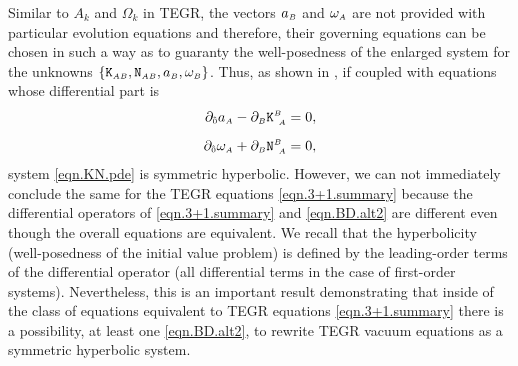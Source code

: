 \documentclass[
10pt, %
a4paper, %
oneside, %
headinclude,footinclude, %
BCOR5mm, %
]{scrartcl}
\newcommand{\sA}{\mathsmaller A}
\newcommand{\sB}{\mathsmaller B}
\newcommand{\pd}[1]{\partial_{#1}}
\newcommand{\Hfin}[2]{\mathtt{H}_{#2#1}}	%
\newcommand{\Hfinnmix}[2]{\hat{\mathtt{H}}^{#2}_{\ #1}}	%
\newcommand{\Efin}[2]{\mathtt{E}^{#1}_{\phantom{#1}#2}}	%
\newcommand{\Efinn}[2]{\hat{\mathtt{E}}^{#1}_{\ #2}}	%
\newcommand{\Kbuch}[2]{\mathtt{K}_{{#1}{#2}}}	%
\newcommand{\Nbuchdown}[2]{\mathtt{N}_{#1#2}}	%
\newcommand{\Kbuchmix}[2]{\mathtt{K}^{#1}_{\ #2}}	%
\newcommand{\Nbuchmix}[2]{\mathtt{N}^{#1}_{\ #2}}	%
\newcommand{\indalg}[1]{\hat{\mathsmaller{#1}}}
\begin{document}
Similar to $ A_k $ and $ \Omega_k $ in TEGR, the vectors $ a_{\sB} $ and $ \omega_{\sA} $ are not 
provided with particular evolution equations and therefore, their governing equations can be chosen 
in such a way as to guaranty the well-posedness of the enlarged system for the unknowns $ 
\{\Kbuch{\sA}{\sB},\Nbuchdown{\sA}{\sB},a_\sB,\omega_\sB \}$. Thus, as shown in 
\cite{Estabrook1997,Buchman2003}, if coupled with equations whose differential part is
\begin{align}\label{eqn.aw.pde}
	\pd{\indalg{0}} a_\sA - \pd{\sB} \Kbuchmix{\sB}{\sA} &= 0,
	\\[2mm]
	\pd{\indalg{0}} \omega_\sA + \pd{\sB} \Nbuchmix{\sB}{\sA} &= 0,
\end{align}
system \eqref{eqn.KN.pde} is symmetric hyperbolic. However, we can not immediately conclude 
the same for the TEGR equations \eqref{eqn.3+1.summary} because the differential operators of 
\eqref{eqn.3+1.summary} and \eqref{eqn.BD.alt2} are different even though the overall equations are 
equivalent. We recall that the hyperbolicity (well-posedness of the initial value problem) is 
defined by the leading-order terms of the differential operator (all differential terms in the case 
of first-order systems). Nevertheless, this is an important result demonstrating that inside of the 
class of equations equivalent to TEGR equations \eqref{eqn.3+1.summary} there is a 
possibility, at least one \eqref{eqn.BD.alt2},  to rewrite TEGR vacuum equations as a symmetric 
hyperbolic system.

\end{document}
